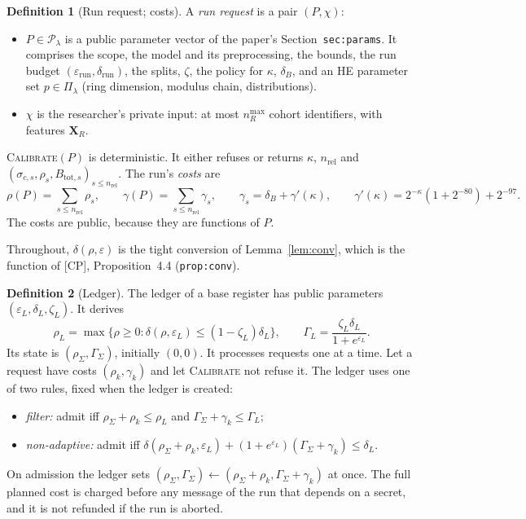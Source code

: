 \documentclass[11pt]{article}
\theoremstyle{definition}
\newtheorem{definition}{Definition}[section]
\theoremstyle{plain}
\newcommand{\bX}{\mathbf{X}}
\newcommand{\Cal}{\textsc{Calibrate}}
\newcommand{\nrel}{n_{\mathrm{rel}}}
\newcommand{\CP}{\textup{[CP]}}
\begin{document}
\begin{definition}[Run request; costs]\label{def:request}
A \emph{run request} is a pair $(P,\chi)$:
\begin{itemize}[nosep]
  \item $P\in\mathcal P_\lambda$ is a public parameter vector of the paper's Section~\texttt{sec:params}. It comprises the scope, the model and its preprocessing, the bounds, the run budget $(\varepsilon_{\mathrm{run}},\delta_{\mathrm{run}})$, the splits, $\zeta$, the policy for $\kappa$, $\delta_B$, and an HE parameter set $p\in\Pi_\lambda$ (ring dimension, modulus chain, distributions).
  \item $\chi$ is the researcher's private input: at most $n_R^{\max}$ cohort identifiers, with features $\bX_R$.
\end{itemize}
\Cal$(P)$ is deterministic. It either refuses or returns $\kappa$, $\nrel$ and $(\sigma_{c,s},\rho_s,B_{\mathrm{tot},s})_{s\le\nrel}$. The run's \emph{costs} are
\[
  \rho(P)=\sum_{s\le\nrel}\rho_s,\qquad
  \gamma(P)=\sum_{s\le\nrel}\gamma_s,\qquad
  \gamma_s=\delta_B+\gamma'(\kappa),\qquad
  \gamma'(\kappa)=2^{-\kappa}(1+2^{-80})+2^{-97}.
\]
The costs are public, because they are functions of $P$.
\end{definition}

Throughout, $\delta(\rho,\varepsilon)$ is the tight conversion of Lemma~\ref{lem:conv}, which is the function of \CP, Proposition~4.4 (\texttt{prop:conv}).

\begin{definition}[Ledger]\label{def:ledger}
The ledger of a base register has public parameters $(\varepsilon_L,\delta_L,\zeta_L)$. It derives
\[
  \rho_L=\max\{\rho\ge0:\delta(\rho,\varepsilon_L)\le(1-\zeta_L)\delta_L\},\qquad\Gamma_L=\frac{\zeta_L\delta_L}{1+e^{\varepsilon_L}} .
\]
Its state is $(\rho_\Sigma,\Gamma_\Sigma)$, initially $(0,0)$. It processes requests one at a time. Let a request have costs $(\rho_k,\gamma_k)$ and let \Cal{} not refuse it. The ledger uses one of two rules, fixed when the ledger is created:
\begin{itemize}[nosep]
  \item[\textbf{(F)}] \emph{filter:} admit iff $\rho_\Sigma+\rho_k\le\rho_L$ and $\Gamma_\Sigma+\gamma_k\le\Gamma_L$;
  \item[\textbf{(N)}] \emph{non-adaptive:} admit iff $\delta(\rho_\Sigma+\rho_k,\varepsilon_L)+(1+e^{\varepsilon_L})(\Gamma_\Sigma+\gamma_k)\le\delta_L$.
\end{itemize}
On admission the ledger sets $(\rho_\Sigma,\Gamma_\Sigma)\gets(\rho_\Sigma+\rho_k,\Gamma_\Sigma+\gamma_k)$ at once. The full planned cost is charged before any message of the run that depends on a secret, and it is not refunded if the run is aborted.
\end{definition}
\end{document}
